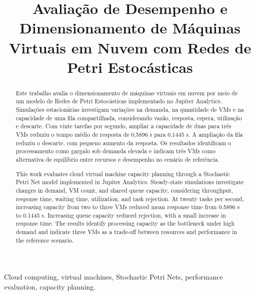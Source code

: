 \documentclass[conference]{IEEEtran}
\begin{document}
\title{Avaliação de Desempenho e Dimensionamento de Máquinas Virtuais em Nuvem com Redes de Petri Estocásticas}

\author{
}

\maketitle

\renewcommand{\abstractname}{Resumo}
\begin{abstract}
Este trabalho avalia o dimensionamento de máquinas virtuais
em nuvem por meio de um modelo de Redes de Petri Estocásticas
implementado no Jupiter Analytics. Simulações estacionárias
investigam variações na demanda, na quantidade de VMs e na
capacidade de uma fila compartilhada, considerando vazão,
resposta, espera, utilização e descarte. Com vinte tarefas
por segundo, ampliar a capacidade de duas para três VMs
reduziu o tempo médio de resposta de 0,5896 s para 0,1445 s.
A ampliação da fila reduziu o descarte, com pequeno aumento
da resposta. Os resultados identificam o processamento como
gargalo sob demanda elevada e indicam três VMs como alternativa
de equilíbrio entre recursos e desempenho no cenário de referência.
\end{abstract}

\renewcommand{\abstractname}{Abstract}
\begin{abstract}
This work evaluates cloud virtual machine capacity planning
through a Stochastic Petri Net model implemented in Jupiter
Analytics. Steady-state simulations investigate changes in
demand, VM count, and shared queue capacity, considering
throughput, response time, waiting time, utilization, and
task rejection. At twenty tasks per second, increasing
capacity from two to three VMs reduced mean response time
from 0.5896 s to 0.1445 s. Increasing queue capacity reduced
rejection, with a small increase in response time. The results
identify processing capacity as the bottleneck under high
demand and indicate three VMs as a trade-off between resources
and performance in the reference scenario.
\end{abstract}

\begin{IEEEkeywords}
Cloud computing, virtual machines, Stochastic Petri Nets,
performance evaluation, capacity planning.
\end{IEEEkeywords}
\end{document}
